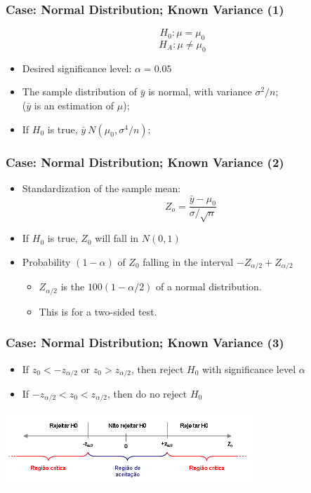\documentclass[10pt]{beamer}
\begin{document}
\begin{frame}
  \frametitle{Case: Normal Distribution; Known Variance (1)}
  \begin{equation*}
    H_0 : \mu = \mu_0 
  \end{equation*}
  \begin{equation*}
    H_A : \mu \neq \mu_0
  \end{equation*}

  \begin{itemize}
  \item Desired significance level: $\alpha = 0.05$
  \item The sample distribution of $\bar{y}$ is normal, with variance
    $\sigma^2/n$;\\ ($\bar{y}$ is an estimation of $\mu$);
  \item If $H_0$ is true, $\bar{y} ~ N(\mu_0,\sigma^4/n)$;
  \end{itemize}
\end{frame}

\begin{frame}
  \frametitle{Case: Normal Distribution; Known Variance (2)}
  \begin{itemize}
  \item Standardization of the sample mean:
    \begin{equation*}
      Z_o = \frac{\bar{y} - \mu_0}{\sigma/\sqrt{n}}
    \end{equation*}
  \item If $H_0$ is true, $Z_0$ will fall in $N(0,1)$
  \item Probability $(1 - \alpha)$ of $Z_0$ falling in the interval
    $-Z_{\alpha/2} +Z_{\alpha/2}$
    \begin{itemize}
      \item $Z_{\alpha/2}$ is the $100(1-\alpha/2)$ of a normal distribution.
      \item This is for a two-sided test.
    \end{itemize}
  \end{itemize}
\end{frame}

\begin{frame}
  \frametitle{Case: Normal Distribution; Known Variance (3)}
  \begin{itemize}
  \item If $z_0 < -z_{\alpha/2}$ or $z_0 > z_{\alpha/2}$, then reject
    $H_0$ with significance level $\alpha$
  \item If $-z_{\alpha/2} < z_0 < z_{\alpha/2}$, then do no reject $H_0$
  \end{itemize}
  \bigskip

  \includegraphics[width=0.7\textwidth]{img/criticalregionZ}
\end{frame}
\end{document}
